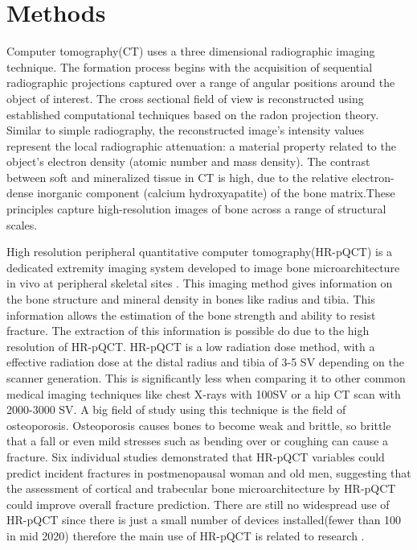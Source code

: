 \documentclass[
a4paper, 
12pt,
grayscalebody, %
abstract=on,
twoside, BCOR10mm, 12pt, DIV13,headinclude, footexclude, final, abstracton, openright
]{ibireprt}
\numberwithin{equation}{chapter}
\numberwithin{table}{chapter}
\numberwithin{figure}{chapter}
\numberwithin{algorithm}{chapter}
\numberwithin{example}{chapter}
\numberwithin{example}{chapter}
\begin{document}
\chapter{Methods}
Computer tomography(CT) uses a three dimensional radiographic imaging technique. The formation process begins with the acquisition of sequential radiographic projections captured over a range of angular positions around the object of interest. The cross sectional field of view is reconstructed using established computational techniques based on the radon projection theory\cite{article}. Similar to simple radiography, the reconstructed image’s intensity values represent the local radiographic attenuation: a material property related to the object’s electron density (atomic number and mass density). The contrast between soft and mineralized tissue in CT is high, due to the relative electron-dense inorganic component (calcium hydroxyapatite) of the bone matrix.These principles capture high-resolution images of bone across a range of structural scales. %

High resolution peripheral quantitative computer tomography(HR-pQCT) is a  dedicated extremity imaging system developed to image bone microarchitecture in vivo at peripheral skeletal sites \cite{Bergh2021}. This imaging method gives information on the bone structure and mineral density in bones like radius and tibia. This information allows the estimation of the bone strength and ability to resist fracture. The extraction of this information is possible do due to the high resolution of HR-pQCT.%
 HR-pQCT is a low radiation dose method, with a effective radiation dose at the distal radius and tibia of  3-5 \textmu SV depending on the scanner  generation. This is significantly less when comparing it to other common medical imaging techniques like chest X-rays with 100\textmu SV or a hip CT scan with 2000-3000 \textmu SV.%
  A big field of study using this technique is the field of osteoporosis. Osteoporosis causes bones to become weak and brittle, so brittle that a fall or even mild stresses such as bending over or coughing can cause a fracture. Six individual studies demonstrated that HR-pQCT variables could predict incident fractures in postmenopausal woman and old men, suggesting that the assessment of cortical and trabecular bone microarchitecture by HR-pQCT could improve overall fracture prediction. There are still no widespread use of HR-pQCT since there is just a small number of devices installed(fewer than 100 in mid 2020) therefore the main use of HR-pQCT is related to research \cite{Bergh2021}.
\end{document}
